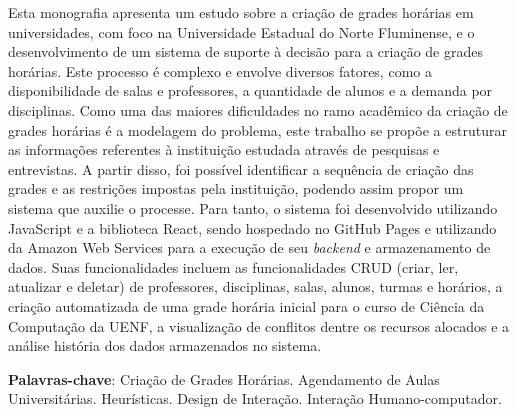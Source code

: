 \setlength{\absparsep}{18pt} %
\begin{resumo}

  Esta monografia apresenta um estudo sobre a criação de grades horárias em universidades, com foco na Universidade Estadual do Norte Fluminense, e o desenvolvimento de um sistema de suporte à decisão para a criação de grades horárias. Este processo é complexo e envolve diversos fatores, como a disponibilidade de salas e professores, a quantidade de alunos e a demanda por disciplinas. Como uma das maiores dificuldades no ramo acadêmico da criação de grades horárias é a modelagem do problema, este trabalho se propõe a estruturar as informações referentes à instituição estudada através de pesquisas e entrevistas. A partir disso, foi possível identificar a sequência de criação das grades e as restrições impostas pela instituição, podendo assim propor um sistema que auxilie o processe. Para tanto, o sistema foi desenvolvido utilizando JavaScript e a biblioteca React, sendo hospedado no GitHub Pages e utilizando da Amazon Web Services para a execução de seu \textit{backend} e armazenamento de dados. Suas funcionalidades incluem as funcionalidades CRUD (criar, ler, atualizar e deletar) de professores, disciplinas, salas, alunos, turmas e horários, a criação automatizada de uma grade horária inicial para o curso de Ciência da Computação da UENF, a visualização de conflitos dentre os recursos alocados e a análise história dos dados armazenados no sistema.

  \textbf{Palavras-chave}: Criação de Grades Horárias. Agendamento de Aulas Universitárias. Heurísticas. Design de Interação. Interação Humano-computador.




\end{resumo}
